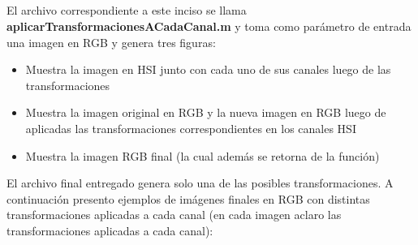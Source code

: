 \documentclass{article}
\begin{document}
\subsection{}

El archivo correspondiente a este inciso se llama \textbf{aplicarTransformacionesACadaCanal.m} y toma como parámetro de entrada una imagen en RGB y genera tres figuras:
\begin{itemize}
\item Muestra la imagen en HSI junto con cada uno de sus canales luego de las transformaciones
\item Muestra la imagen original en RGB y la nueva imagen en RGB luego de aplicadas las transformaciones correspondientes en los canales HSI
\item Muestra la imagen RGB final (la cual además se retorna de la función)
\end{itemize} 

El archivo final entregado genera solo una de las posibles transformaciones. 
A continuación presento ejemplos de imágenes finales en RGB con distintas transformaciones aplicadas a cada canal (en cada imagen aclaro las transformaciones aplicadas a cada canal):
\end{document}

